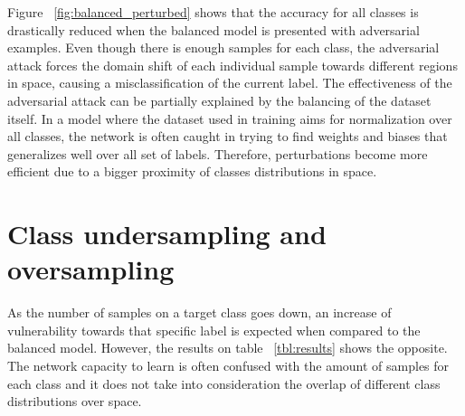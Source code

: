Figure ~\ref{fig:balanced_perturbed} shows that the accuracy for all classes is drastically reduced when the balanced model is presented with adversarial examples. Even though there is enough samples for each class, the adversarial attack forces the domain shift of each individual sample towards different regions in space, causing a misclassification of the current label. The effectiveness of the adversarial attack can be partially explained by the balancing of the dataset itself. In a model where the dataset used in training aims for normalization over all classes, the network is often caught in trying to find weights and biases that generalizes well over all set of labels. Therefore, perturbations become more efficient due to a bigger proximity of classes distributions in space.


\section{Class undersampling and oversampling}

As the number of samples on a target class goes down, an increase of vulnerability towards that specific label is expected when compared to the balanced model. However, the results on table  ~\ref{tbl:results} shows the opposite. The network capacity to learn is often confused with the amount of samples for each class and it does not take into consideration the overlap of different class distributions over space.

